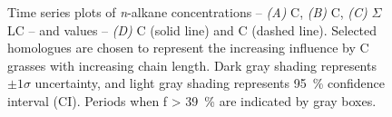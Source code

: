 \begin{figure}[p]
	\caption[\textit{n}-alkane concentration and  time-series plots]{Time series plots of \textit{n}-alkane concentrations -- \textit{(A)} C, \textit{(B)} C, \textit{(C)} $\Sigma$LC -- and  values -- \textit{(D)} C (solid line) and C (dashed line). Selected homologues are chosen to represent the increasing influence by C grasses with increasing chain length. Dark gray shading represents $\pm 1\sigma$ uncertainty, and light gray shading represents \SI{95}{\%} confidence interval (CI). Periods when f \SI{> 39}{\%} are indicated by gray boxes.}
	\label{Ch4Fig:4} 
\end{figure}

